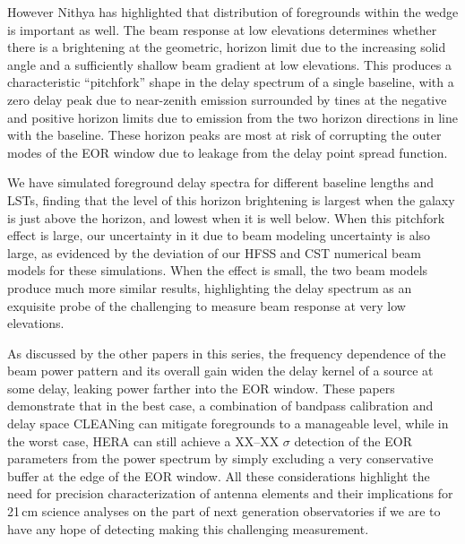 \documentclass[preprint]{aastex}
\begin{document}
However Nithya has highlighted that distribution of foregrounds within the wedge is important as well. The beam response at low elevations determines whether there is a brightening at the geometric, horizon limit due to the increasing solid angle and a sufficiently shallow beam gradient at low elevations. This produces a characteristic ``pitchfork'' shape in the delay spectrum of a single baseline, with a zero delay peak due to near-zenith emission surrounded by tines at the negative and positive horizon limits due to emission from the two horizon directions in line with the baseline. These horizon peaks are most at risk of corrupting the outer modes of the EOR window due to leakage from the delay point spread function. 


We have simulated foreground delay spectra for different baseline lengths and LSTs, finding that the level of this horizon brightening is largest when the galaxy is just above the horizon, and lowest when it is well below. When this pitchfork effect is large, our uncertainty in it due to beam modeling uncertainty is also large, as evidenced by the deviation of our HFSS and CST numerical beam models for these simulations. When the effect is small, the two beam models produce much more similar results, highlighting the delay spectrum as an exquisite probe of the challenging to measure beam response at very low elevations.


As discussed by the other papers in this series, the frequency dependence of the beam power pattern and its overall gain widen the delay kernel of a source at some delay, leaking power farther into the EOR window. These papers demonstrate that in the best case, a combination of bandpass calibration and delay space CLEANing can mitigate foregrounds to a manageable level, while in the worst case, HERA can still achieve a XX--XX $\sigma$ detection of the EOR parameters from the power spectrum by simply excluding a very conservative buffer at the edge of the EOR window. All these considerations highlight the need for precision characterization of antenna elements and their implications for 21\,cm science analyses on the part of next generation observatories if we are to have any hope of detecting making this challenging measurement.
\end{document}
